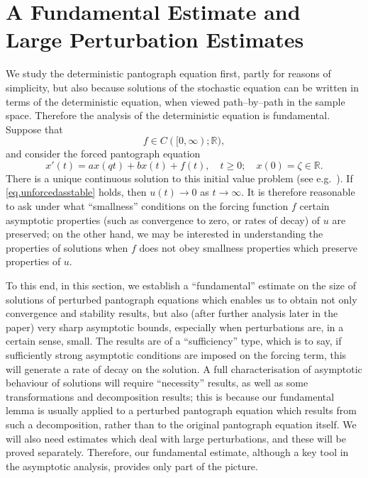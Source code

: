 \documentclass[a4paper,10pt,reqno]{amsart}
\numberwithin{equation}{section}
\theoremstyle{definition}
\theoremstyle{remark}
\DeclareMathOperator{\1}{\mathbbm 1}
\begin{document}
	\section{A Fundamental Estimate and Large Perturbation Estimates}
	
	We study the deterministic pantograph equation first, partly for reasons of simplicity, but also because solutions of the stochastic equation can be written in terms of the deterministic equation, when viewed path--by--path in the sample space. Therefore the analysis of the deterministic equation is fundamental. Suppose that 
	\begin{equation} \label{eq.fcns}
		f\in C([0,\infty);\mathbb{R}),
	\end{equation} 
	and consider the forced pantograph equation
	\begin{equation} \label{eq.forced}
		x'(t)=ax(qt)+bx(t)+f(t), \quad t\geq 0; \quad x(0)=\zeta\in \mathbb{R}.
	\end{equation}
	There is a unique continuous solution to this initial value problem (see e.g.~\cite{AppBuck10}). If \eqref{eq.unforcedasstable} holds, then  $u(t)\to 0$ as $t\to\infty$. It is therefore reasonable to ask under what ``smallness'' conditions on the forcing function $f$ certain asymptotic properties (such as convergence to zero, or rates of decay) of $u$ are preserved; on the other hand, we may be interested in understanding the properties of solutions when $f$ does not obey smallness   properties which preserve properties of $u$.  
	
	To this end, in this section, we establish a ``fundamental'' estimate on the size of solutions of perturbed pantograph equations which enables us to obtain not only convergence and stability results, but also (after further analysis later in the paper) very sharp asymptotic bounds, especially when perturbations are, in a certain sense, small.
	The results are of a ``sufficiency'' type, which is to say, if sufficiently strong asymptotic conditions are imposed on the forcing term, this will generate a rate of decay on the solution. A full characterisation of asymptotic behaviour of solutions will require ``necessity'' results, as well as some transformations and decomposition results; this is because our fundamental lemma is usually applied to a perturbed pantograph equation which results from such a decomposition, rather than to the original pantograph equation itself. We will also need estimates which deal with large perturbations, and these will be proved separately. Therefore, our fundamental estimate, although a key tool in the asymptotic analysis, provides only part of the picture. 
	
\end{document}
